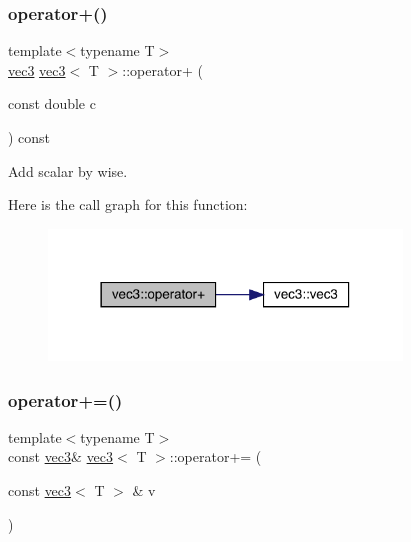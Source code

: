 \subsubsection{\texorpdfstring{operator+()}{operator+()}\hspace{0.1cm}{\footnotesize\ttfamily [2/2]}}
{\footnotesize\ttfamily template$<$typename T$>$ \\
\mbox{\hyperlink{structvec3}{vec3}} \mbox{\hyperlink{structvec3}{vec3}}$<$ T $>$\+::operator+ (\begin{DoxyParamCaption}\item[{const double}]{c }\end{DoxyParamCaption}) const\hspace{0.3cm}{\ttfamily [inline]}}



Add scalar by wise. 

Here is the call graph for this function\+:\nopagebreak
\begin{figure}[H]
\begin{center}
\leavevmode
\includegraphics[width=266pt]{structvec3_a479dd2445daeeec47e6a5a8e4487f51b_cgraph}
\end{center}
\end{figure}
\mbox{\label{structvec3_a5d12f7aba42eea6253a4ada5ce73b7d8}} 
\subsubsection{\texorpdfstring{operator+=()}{operator+=()}\hspace{0.1cm}{\footnotesize\ttfamily [1/2]}}
{\footnotesize\ttfamily template$<$typename T$>$ \\
const \mbox{\hyperlink{structvec3}{vec3}}\& \mbox{\hyperlink{structvec3}{vec3}}$<$ T $>$\+::operator+= (\begin{DoxyParamCaption}\item[{const \mbox{\hyperlink{structvec3}{vec3}}$<$ T $>$ \&}]{v }\end{DoxyParamCaption})\hspace{0.3cm}{\ttfamily [inline]}}

